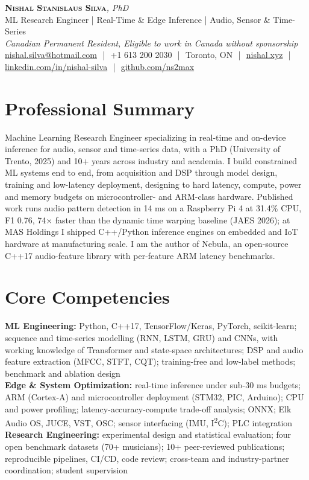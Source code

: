 \documentclass[11pt]{article}
\makeatletter
\newcommand{\cvName}{Nishal Stanislaus Silva}
\newcommand{\cvEmail}{nishal.silva@hotmail.com}
\newcommand{\cvPhone}{+1 613 200 2030}
\newcommand{\cvCity}{Toronto, ON}
\newcommand{\cvSite}{https://nishal.xyz}
\newcommand{\cvLinkedIn}{https://www.linkedin.com/in/nishal-silva}
\newcommand{\cvGitHub}{https://github.com/ns2max}
\newcommand{\cvStatus}{Canadian Permanent Resident, Eligible to work in Canada without sponsorship}
\newcommand{\cvTagline}{ML Research Engineer | Real-Time \& Edge Inference | Audio, Sensor \& Time-Series}
\makeatother
\begin{document}
\pagestyle{empty}

\begin{center}
    {\LARGE \scshape \textbf{\cvName}}{\large \textit{, PhD}}
    \\[1pt]
    {\small \cvTagline}
    \\[1pt]
    {\footnotesize\textit{\cvStatus}}
    \\[1pt]
    {\small
    \href{mailto:\cvEmail}{\cvEmail}
    \,\,|\,\, \cvPhone
    \,\,|\,\, \cvCity
    \,\,|\,\, \href{\cvSite}{nishal.xyz}
    \,\,|\,\, \href{\cvLinkedIn}{linkedin.com/in/nishal-silva}
    \,\,|\,\, \href{\cvGitHub}{github.com/ns2max}}
\end{center}

\section*{Professional Summary}

Machine Learning Research Engineer specializing in real-time and on-device inference for audio, sensor and time-series data, with a PhD (University of Trento, 2025) and 10+ years across industry and academia. I build constrained ML systems end to end, from acquisition and DSP through model design, training and low-latency deployment, designing to hard latency, compute, power and memory budgets on microcontroller- and ARM-class hardware. Published work runs audio pattern detection in 14 ms on a Raspberry Pi 4 at 31.4\% CPU, F1 0.76, 74$\times$ faster than the dynamic time warping baseline (JAES 2026); at MAS Holdings I shipped C++/Python inference engines on embedded and IoT hardware at manufacturing scale. I am the author of Nebula, an open-source C++17 audio-feature library with per-feature ARM latency benchmarks.

\section*{Core Competencies}

\textbf{ML Engineering:} Python, C++17, TensorFlow/Keras, PyTorch, scikit-learn; sequence and time-series modelling (RNN, LSTM, GRU) and CNNs, with working knowledge of Transformer and state-space architectures; DSP and audio feature extraction (MFCC, STFT, CQT); training-free and low-label methods; benchmark and ablation design\\
\textbf{Edge \& System Optimization:} real-time inference under sub-30 ms budgets; ARM (Cortex-A) and microcontroller deployment (STM32, PIC, Arduino); CPU and power profiling; latency-accuracy-compute trade-off analysis; ONNX; Elk Audio OS, JUCE, VST, OSC; sensor interfacing (IMU, I\textsuperscript{2}C); PLC integration\\
\textbf{Research Engineering:} experimental design and statistical evaluation; four open benchmark datasets (70+ musicians); 10+ peer-reviewed publications; reproducible pipelines, CI/CD, code review; cross-team and industry-partner coordination; student supervision
\end{document}
